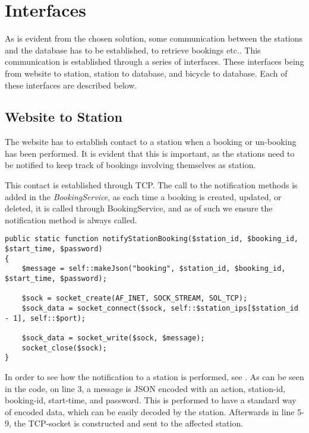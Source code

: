\section{Interfaces}
As is evident from the chosen solution, some communication between the stations and the database has to be established, to retrieve bookings etc..
This communication is established through a series of interfaces.
These interfaces being from website to station, station to database, and bicycle to database.
Each of these interfaces are described below.

\subsection{Website to Station}\label{sec:webToStationI}
The website has to establish contact to a station when a booking or un-booking has been performed.
It is evident that this is important, as the stations need to be notified to keep track of bookings involving themselves as station.

This contact is established through TCP.
The call to the notification methods is added in the \textit{BookingService}, as each time a booking is created, updated, or deleted, it is called through BookingService, and as of such we ensure the notification method is always called.

\begin{minipage}{\textwidth}
\begin{lstlisting}[caption = {Function for notifying a station of a new booking.}, label = {lst:notifystationbooking}]
public static function notifyStationBooking($station_id, $booking_id, $start_time, $password)
{
	$message = self::makeJson("booking", $station_id, $booking_id, $start_time, $password);
	
	$sock = socket_create(AF_INET, SOCK_STREAM, SOL_TCP);
	$sock_data = socket_connect($sock, self::$station_ips[$station_id - 1], self::$port);
	
	$sock_data = socket_write($sock, $message);
	socket_close($sock);
}
\end{lstlisting}
\end{minipage}

In order to see how the notification to a station is performed, see .
As can be seen in the code, on line 3, a message is JSON encoded with an action, station-id, booking-id, start-time, and password.
This is performed to have a standard way of encoded data, which can be easily decoded by the station.
Afterwards in line 5-9, the TCP-socket is constructed and sent to the affected station.

